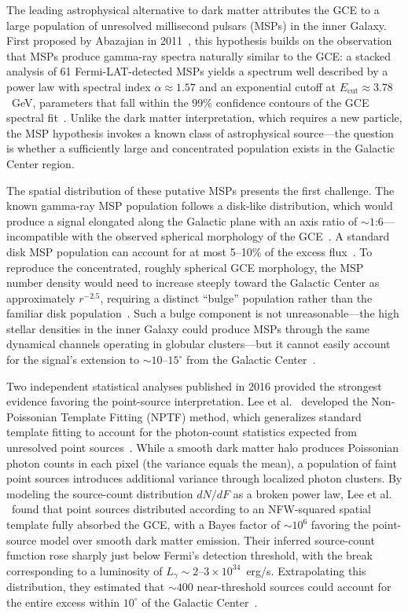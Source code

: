 The leading astrophysical alternative to dark matter attributes the GCE to a large population of unresolved millisecond pulsars (MSPs) in the inner Galaxy.
First proposed by Abazajian in 2011~\cite{Abazajian:2010zy}, this hypothesis builds on the observation that MSPs produce gamma-ray spectra naturally similar to the GCE: a stacked analysis of 61 Fermi-LAT-detected MSPs yields a spectrum well described by a power law with spectral index $\alpha \approx 1.57$ and an exponential cutoff at $E_{\mathrm{cut}} \approx 3.78$~GeV, parameters that fall within the 99\% confidence contours of the GCE spectral fit~\cite{Calore:2014xka}.
Unlike the dark matter interpretation, which requires a new particle, the MSP hypothesis invokes a known class of astrophysical source---the question is whether a sufficiently large and concentrated population exists in the Galactic Center region.

The spatial distribution of these putative MSPs presents the first challenge.
The known gamma-ray MSP population follows a disk-like distribution, which would produce a signal elongated along the Galactic plane with an axis ratio of $\sim 1$:$6$---incompatible with the observed spherical morphology of the GCE~\cite{Daylan:2014rsa}.
A standard disk MSP population can account for at most 5--10\% of the excess flux~\cite{Calore:2014xka}.
To reproduce the concentrated, roughly spherical GCE morphology, the MSP number density would need to increase steeply toward the Galactic Center as approximately $r^{-2.5}$, requiring a distinct ``bulge'' population rather than the familiar disk population~\cite{Calore:2014xka}.
Such a bulge component is not unreasonable---the high stellar densities in the inner Galaxy could produce MSPs through the same dynamical channels operating in globular clusters---but it cannot easily account for the signal's extension to $\sim 10$--$15^\circ$ from the Galactic Center~\cite{Calore:2014xka}.

Two independent statistical analyses published in 2016 provided the strongest evidence favoring the point-source interpretation.
Lee et al.
\ developed the Non-Poissonian Template Fitting (NPTF) method, which generalizes standard template fitting to account for the photon-count statistics expected from unresolved point sources~\cite{Lee:2015fea}.
While a smooth dark matter halo produces Poissonian photon counts in each pixel (the variance equals the mean), a population of faint point sources introduces additional variance through localized photon clusters.
By modeling the source-count distribution $dN/dF$ as a broken power law, Lee et al.
\ found that point sources distributed according to an NFW-squared spatial template fully absorbed the GCE, with a Bayes factor of $\sim 10^6$ favoring the point-source model over smooth dark matter emission.
Their inferred source-count function rose sharply just below Fermi's detection threshold, with the break corresponding to a luminosity of $L_\gamma \sim 2$--$3 \times 10^{34}$~erg/s.
Extrapolating this distribution, they estimated that $\sim 400$ near-threshold sources could account for the entire excess within $10^\circ$ of the Galactic Center~\cite{Lee:2015fea}.

